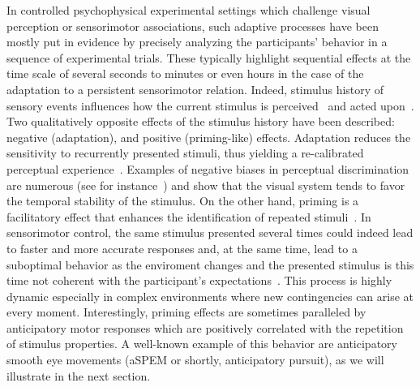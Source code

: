 \documentclass[10pt,letterpaper]{article}
\newcommand{\citep}[1]{\cite{#1}}
\newcommand{\Rone}[1]{\textbf{\textcolor{magenta}{[rev 1: #1]}}}
\newcommand{\AM}[1]{\textbf{\textcolor{blue}{[AM: #1]}}}
\begin{document}
In controlled psychophysical experimental settings which challenge visual perception or sensorimotor associations,
such adaptive processes have been mostly put in evidence
by precisely analyzing the participants' behavior in a sequence of experimental trials.
These typically highlight sequential effects
at the time scale of several seconds to minutes
or even hours in the case of the adaptation to a persistent sensorimotor relation.
Indeed, stimulus history of sensory events influences
how the current stimulus is perceived~\citep{Sotiropoulos2011,Adams12,ChopinMamassian2012,FischerWhitney2014,Cicchini_PRSB_2018} and
acted upon~\citep{WallmanFuchs1998,Carpenter1995, Maus2015,Damasse18}.
Two qualitatively opposite effects of the stimulus history have been described:
negative (adaptation), and positive (priming-like) effects.
Adaptation reduces the sensitivity to recurrently presented stimuli,
thus yielding a re-calibrated perceptual experience~\citep{Clifford2007, Webster2011, Kohn2007}.
Examples of negative biases in perceptual discrimination are numerous
(see for instance~\citep{KanaiVerstraten2005,ChopinMamassian2012}) and
show that the visual system tends
to favor the temporal stability of the stimulus.
On the other hand, priming is a facilitatory effect that
enhances the identification of repeated stimuli~\citep{Verstraten1994, Tiest2009}.
In sensorimotor control,
the same stimulus presented several times could indeed
lead to faster and more accurate responses and,
at the same time, lead to a suboptimal behavior
as the enviroment changes and the presented stimulus is this time not coherent
with the participant's expectations~\citep{Hyman1953, Yu2009}.
This process is highly dynamic especially in complex environments
where new contingencies can arise at every moment.
Interestingly, priming effects %
are sometimes paralleled by anticipatory motor responses
which are positively correlated with the repetition of stimulus properties.
A well-known example of this behavior
are anticipatory smooth eye movements (aSPEM or shortly, anticipatory pursuit),
as we will illustrate in the next section.
\end{document}
